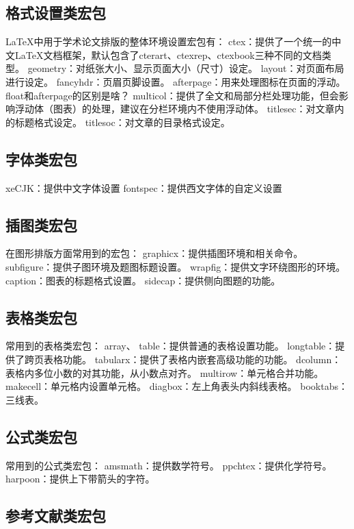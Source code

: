 \documentclass[12pt]{book}
\begin{document}
\subsection{格式设置类宏包}

\LaTeX{}中用于学术论文排版的整体环境设置宏包有：
ctex：提供了一个统一的中文\LaTeX{}文档框架，默认包含了cterart、ctexrep、ctexbook三种不同的文档类型。
geometry：对纸张大小、显示页面大小（尺寸）设定。
layout：对页面布局进行设定。
fancyhdr：页眉页脚设置。
afterpage：用来处理图标在页面的浮动。float和afterpage的区别是啥？
multicol：提供了全文和局部分栏处理功能，但会影响浮动体（图表）的处理，建议在分栏环境内不使用浮动体。
titlesec：对文章内的标题格式设定。
titlesoc：对文章的目录格式设定。


\subsection{字体类宏包}

xeCJK：提供中文字体设置
fontspec：提供西文字体的自定义设置

\subsection{插图类宏包}

在图形排版方面常用到的宏包：
graphicx：提供插图环境和相关命令。
subfigure：提供子图环境及题图标题设置。
wrapfig：提供文字环绕图形的环境。
caption：图表的标题格式设置。
sidecap：提供侧向图题的功能。

\subsection{表格类宏包}


常用到的表格类宏包：
array、
table：提供普通的表格设置功能。
longtable：提供了跨页表格功能。
tabularx：提供了表格内嵌套高级功能的功能。
dcolumn：表格内多位小数的对其功能，从小数点对齐。
multirow：单元格合并功能。
makecell：单元格内设置单元格。
diagbox：左上角表头内斜线表格。
booktabs：三线表。


\subsection{公式类宏包}

常用到的公式类宏包：
amsmath：提供数学符号。
ppchtex：提供化学符号。
harpoon：提供上下带箭头的字符。

\subsection{参考文献类宏包}
\end{document}
